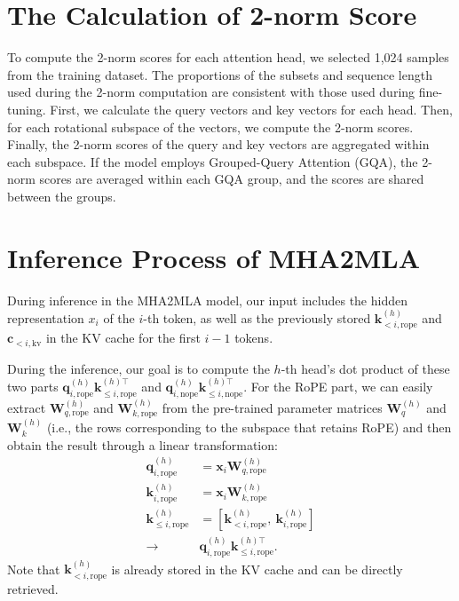 \newpage
\section{The Calculation of 2-norm Score}
\label{app:2_norm}


To compute the 2-norm scores for each attention head, we selected 1,024 samples from the training dataset. The proportions of the subsets and sequence length used during the 2-norm computation are consistent with those used during fine-tuning. First, we calculate the query vectors and key vectors for each head. Then, for each rotational subspace of the vectors, we compute the 2-norm scores. Finally, the 2-norm scores of the query and key vectors are aggregated within each subspace. If the model employs Grouped-Query Attention (GQA), the 2-norm scores are averaged within each GQA group, and the scores are shared between the groups.

\section{Inference Process of MHA2MLA}
\label{app:mha2mla_infer}
During inference in the MHA2MLA model, our input includes the hidden representation \( x_i \) of the \( i \)-th token, as well as the previously stored \(\bm{k}_{<i, \text{rope}}^{(h)}\) and \(\bm{c}_{<i, \text{kv}}\) in the KV cache for the first \( i-1 \) tokens.  

During the inference, our goal is to compute the \( h \)-th head's dot product of these two parts $\bm{q}_{i,\text{rope}}^{(h)} \bm{k}_{\le i,\text{rope}}^{(h)\top}$ and $\bm{q}_{i,\text{nope}}^{(h)} \bm{k}_{\le i,\text{nope}}^{(h)\top}$.
For the RoPE part, we can easily extract \( \bm{W}_{q, \text{rope}}^{(h)} \) and \( \bm{W}_{k, \text{rope}}^{(h)} \) from the pre-trained parameter matrices \( \bm{W}_q^{(h)} \) and \( \bm{W}_k^{(h)} \) (i.e., the rows corresponding to the subspace that retains RoPE) and then obtain the result through a linear transformation:
\begin{align*}  
\bm{q}_{i,\text{rope}}^{(h)} &= \bm{x}_i\bm{W}_{q,
\text{rope}}^{(h)}\\
\bm{k}_{i,\text{rope}}^{(h)} &= \bm{x}_i\bm{W}_{k,
\text{rope}}^{(h)}\\
\bm{k}_{\le i,\text{rope}}^{(h)} &= [\bm{k}_{<i, \text{rope}}^{(h)}, ~\bm{k}_{i,\text{rope}}^{(h)}]
\\ \to ~&\bm{q}_{i,\text{rope}}^{(h)} \bm{k}_{\le i,\text{rope}}^{(h)\top}.
\end{align*}
Note that \(\bm{k}_{<i, \text{rope}}^{(h)}\) is already stored in the KV cache and can be directly retrieved.

